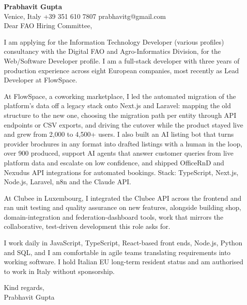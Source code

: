 \documentclass[a4paper,10.5pt]{article}
\begin{document}
\textbf{Prabhavit Gupta}\\
Venice, Italy \textbar{} +39 351 610 7807 \textbar{} prabhavitg@gmail.com\\[10pt]
Dear FAO Hiring Committee,

I am applying for the Information Technology Developer (various profiles) consultancy with the Digital FAO and Agro-Informatics Division, for the Web/Software Developer profile. I am a full-stack developer with three years of production experience across eight European companies, most recently as Lead Developer at FlowSpace.

At FlowSpace, a coworking marketplace, I led the automated migration of the platform's data off a legacy stack onto Next.js and Laravel: mapping the old structure to the new one, choosing the migration path per entity through API endpoints or CSV exports, and driving the cutover while the product stayed live and grew from 2,000 to 4,500+ users. I also built an AI listing bot that turns provider brochures in any format into drafted listings with a human in the loop, over 900 produced, support AI agents that answer customer queries from live platform data and escalate on low confidence, and shipped OfficeRnD and Nexudus API integrations for automated bookings. Stack: TypeScript, Next.js, Node.js, Laravel, n8n and the Claude API.

At Clubee in Luxembourg, I integrated the Clubee API across the frontend and ran unit testing and quality assurance on new features, alongside building shop, domain-integration and federation-dashboard tools, work that mirrors the collaborative, test-driven development this role asks for.

I work daily in JavaScript, TypeScript, React-based front ends, Node.js, Python and SQL, and I am comfortable in agile teams translating requirements into working software. I hold Italian EU long-term resident status and am authorised to work in Italy without sponsorship.

Kind regards,\\
Prabhavit Gupta
\end{document}
